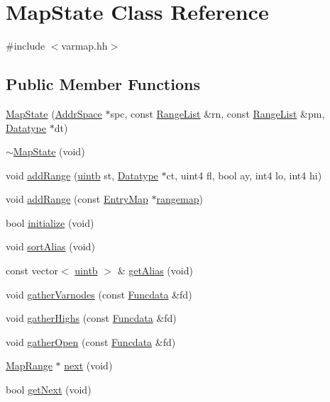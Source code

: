 \hypertarget{class_map_state}{}\section{Map\+State Class Reference}
\label{class_map_state}


{\ttfamily \#include $<$varmap.\+hh$>$}

\subsection*{Public Member Functions}
\begin{DoxyCompactItemize}
\item 
\mbox{\hyperlink{class_map_state_a0f570a682e1cadffc4b60a8fd50837cf}{Map\+State}} (\mbox{\hyperlink{class_addr_space}{Addr\+Space}} $\ast$spc, const \mbox{\hyperlink{class_range_list}{Range\+List}} \&rn, const \mbox{\hyperlink{class_range_list}{Range\+List}} \&pm, \mbox{\hyperlink{class_datatype}{Datatype}} $\ast$dt)
\item 
\mbox{\hyperlink{class_map_state_a39729b68f74a378c3a0fda232bbc1500}{$\sim$\+Map\+State}} (void)
\item 
void \mbox{\hyperlink{class_map_state_a89375399460ed36e13fbc9518ae7dad7}{add\+Range}} (\mbox{\hyperlink{types_8h_a2db313c5d32a12b01d26ac9b3bca178f}{uintb}} st, \mbox{\hyperlink{class_datatype}{Datatype}} $\ast$ct, uint4 fl, bool ay, int4 lo, int4 hi)
\item 
void \mbox{\hyperlink{class_map_state_a0ed32adc04fe0dc1edbbdc63ee693481}{add\+Range}} (const \mbox{\hyperlink{database_8hh_a44a8ea0c0009b316b2651d374e5d4260}{Entry\+Map}} $\ast$\mbox{\hyperlink{classrangemap}{rangemap}})
\item 
bool \mbox{\hyperlink{class_map_state_a517ee785ba7b8b397e76b75d8e085bae}{initialize}} (void)
\item 
void \mbox{\hyperlink{class_map_state_a609b3e862e2b69d179e2f500c59a0a53}{sort\+Alias}} (void)
\item 
const vector$<$ \mbox{\hyperlink{types_8h_a2db313c5d32a12b01d26ac9b3bca178f}{uintb}} $>$ \& \mbox{\hyperlink{class_map_state_ac012c72e8f7813346c8d74ce76f3faf0}{get\+Alias}} (void)
\item 
void \mbox{\hyperlink{class_map_state_a83662d09d19a51e0ecbf8b09e63e9628}{gather\+Varnodes}} (const \mbox{\hyperlink{class_funcdata}{Funcdata}} \&fd)
\item 
void \mbox{\hyperlink{class_map_state_ac3a0c8da3331067931f75269daa81aed}{gather\+Highs}} (const \mbox{\hyperlink{class_funcdata}{Funcdata}} \&fd)
\item 
void \mbox{\hyperlink{class_map_state_a43f627e6a51815b273f5dfbcc71ac605}{gather\+Open}} (const \mbox{\hyperlink{class_funcdata}{Funcdata}} \&fd)
\item 
\mbox{\hyperlink{struct_map_range}{Map\+Range}} $\ast$ \mbox{\hyperlink{class_map_state_aaf25115c1c0c0f92190524ca722a2aa6}{next}} (void)
\item 
bool \mbox{\hyperlink{class_map_state_a94ebfd56a48cd7ce01899a4726c619c7}{get\+Next}} (void)
\end{DoxyCompactItemize}


